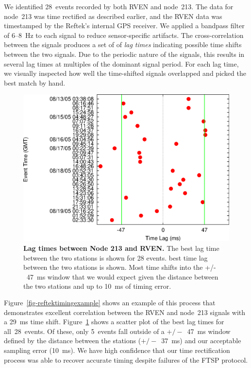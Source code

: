 We identified 28~events recorded by both RVEN and node~213.  The data for
node~213 was time rectified as described earlier, and the RVEN data was
timestamped by the Reftek's internal GPS receiver.  We applied a bandpass
filter of 6--8~Hz to each signal to reduce sensor-specific artifacts. The
cross-correlation between the signals produces a set of of {\em lag times}
indicating possible time shifts between the two signals.  Due to the periodic
nature of the signals, this results in several lag times at multiples of the
dominant signal period. For each lag time, we visually inspected how well the
time-shifted signals overlapped and picked the best match by hand.

\begin{figure}[t]
\begin{center}
\includegraphics[width=\hsize]{./figs/OSDI2006/2006-TimingLags.eps}
\end{center}
\caption{{\bf Lag times between Node 213 and RVEN.}
The best lag time between the two stations is shown for 28 events.  best time
lag between the two stations is shown.  Most time shifts into the +/-~47~ms
window that we would expect given the distance between the two stations and
up to 10~ms of timing error.}
\label{fig-timinglags}
\end{figure}

Figure~\ref{fig-reftektimingexample} shows an example of this process that demonstrates
excellent correlation between the RVEN and node~213 signals with a 29~ms time
shift. Figure~\ref{fig-timinglags} shows a scatter plot of the best lag times
for all~28~events.  Of these, only 5~events fall outside of a $+/-$~47~ms
window defined by the distance between the stations ($+/-$~37~ms) and our
acceptable sampling error (10~ms). We have high confidence that our
time rectification process was able to recover accurate timing despite
failures of the FTSP protocol.

